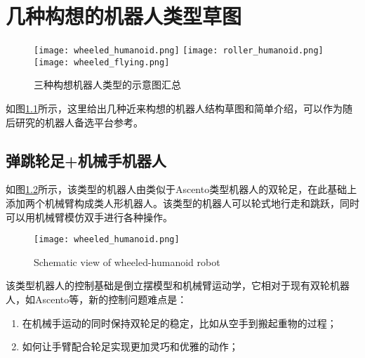 
\chapter{几种构想的机器人类型草图}
\begin{figure}
  \centering
    {\texttt{[image: wheeled\_humanoid.png]}}
    {\texttt{[image: roller\_humanoid.png]}}
    {\texttt{[image: wheeled\_flying.png]}}
  \caption{三种构想机器人类型的示意图汇总}
  \label{fig:multi_image}
\end{figure}

如图\ref{fig:multi_image}所示，这里给出几种近来构想的机器人结构草图和简单介绍，可以作为随后研究的机器人备选平台参考。

\section[弹跳轮足+机械手机器人]{弹跳轮足+机械手机器人}
如图\ref{fig:wheeled_humanoid}所示，该类型的机器人由类似于Ascento\cite[p1]{Klemm_Morra_Salzmann_Tschopp_Bodie_Gulich_Kung_Mannhart_Pfister_Vierneisel_et_al_2019}类型机器人的双轮足，在此基础上添加两个机械臂构成类人形机器人。该类型的机器人可以轮式地行走和跳跃，同时可以用机械臂模仿双手进行各种操作。

\begin{figure}
  \centering
  \texttt{[image: wheeled\_humanoid.png]}
  \caption[wheeled_humanoid]{Schematic view of wheeled-humanoid robot}
  \label{fig:wheeled_humanoid}
\end{figure}

该类型机器人的控制基础是倒立摆模型和机械臂运动学，它相对于现有双轮机器人，如Ascento\cite[p1]{Klemm_Morra_Salzmann_Tschopp_Bodie_Gulich_Kung_Mannhart_Pfister_Vierneisel_et_al_2019}等，新的控制问题难点是：
\begin{enumerate}
  \item 在机械手运动的同时保持双轮足的稳定，比如从空手到搬起重物的过程；
  \item 如何让手臂配合轮足实现更加灵巧和优雅的动作；
\end{enumerate}

